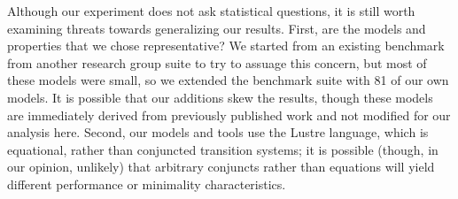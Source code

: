 
Although our experiment does not ask statistical questions, it is still worth examining threats towards generalizing our results.  First, are the models and properties that we chose representative?  We started from an existing benchmark from another research group suite to try to assuage this concern, but most of these models were small, so we extended the benchmark suite with 81 of our own models.  It is possible that our additions skew the results, though these models are immediately derived from previously published work and not modified for our analysis here.  Second, our models and tools use the Lustre language, which is equational, rather than conjuncted transition systems; it is possible (though, in our opinion, unlikely) that arbitrary conjuncts rather than equations will yield different performance or minimality characteristics.

